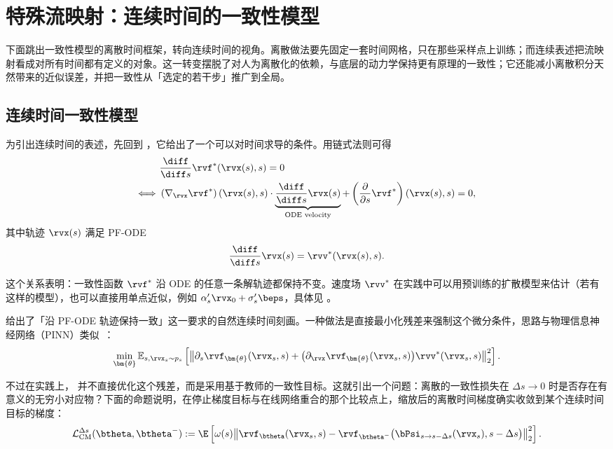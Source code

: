 \section{特殊流映射：连续时间的一致性模型}\label{sec:conti-cm}

下面跳出一致性模型的离散时间框架，转向连续时间的视角。离散做法要先固定一套时间网格，只在那些采样点上训练；而连续表述把流映射看成对所有时间都有定义的对象。这一转变摆脱了对人为离散化的依赖，与底层的动力学保持更有原理的一致性；它还能减小离散积分天然带来的近似误差，并把一致性从「选定的若干步」推广到全局。

\subsection{连续时间一致性模型}\label{subsec:conti-ct}
为引出连续时间的表述，先回到
，它给出了一个可以对时间求导的条件。用链式法则可得
\begin{align}\label{eq:conti-ct-motivation}
\begin{aligned}
        &\frac{\diff }{\diff s} \rvf^*(\rvx(s), s) = 0 \\
    \Longleftrightarrow\,\,
    &\left(\nabla_{\rvx} \rvf^*\right)(\rvx(s), s) \cdot
    \underbrace{\frac{\diff }{\diff s} \rvx(s)}_{\text{ODE velocity}} +
    \left(\frac{\partial }{\partial s} \rvf^*\right)(\rvx(s), s) = 0,
\end{aligned}
\end{align}
其中轨迹 $\rvx(s)$ 满足 PF-ODE
\begin{align*}
    \frac{\diff }{\diff s}\rvx(s) =  \rvv^*(\rvx(s), s).
\end{align*}

这个关系表明：一致性函数 $\rvf^*$ 沿 ODE 的任意一条解轨迹都保持不变。速度场 $\rvv^*$ 在实践中可以用预训练的扩散模型来估计（若有这样的模型），也可以直接用单点近似，例如
$\alpha_s' \rvx_0 + \sigma_s' \beps$，具体见
。

 给出了「沿 PF-ODE 轨迹保持一致」这一要求的自然连续时间刻画。一种做法是直接最小化残差来强制这个微分条件，思路与物理信息神经网络（PINN）类似~\citep{raissi2018deep,boffi2024flow}：
\begin{align*}
\min_{\bm{\theta}}
\mathbb{E}_{s,\rvx_s\sim p_s}
\left[
\left\|
\partial_s\rvf_{\bm{\theta}}(\rvx_s,s)
+
\big(\partial_{\rvx}\rvf_{\bm{\theta}}(\rvx_s,s)\big)
\rvv^*(\rvx_s,s)
\right\|_2^2
\right].
\end{align*}

不过在实践上，\citet{song2023consistency,lu2024simplifying} 并不直接优化这个残差，而是采用基于教师的一致性目标。这就引出一个问题：离散的一致性损失在 $\Delta s \to 0$ 时是否存在有意义的无穷小对应物？下面的命题说明，在停止梯度目标与在线网络重合的那个比较点上，缩放后的离散时间梯度确实收敛到某个连续时间目标的梯度：
\begin{align}\label{eq:cm-discrete}
\mathcal{L}_{\mathrm{CM}}^{\Delta s}(\btheta,\btheta^-)
:= \E \left[\omega(s) \big\|
\rvf_{\btheta}(\rvx_s,s) -
\rvf_{\btheta^-} \big(\bPsi_{s\to s-\Delta s}(\rvx_s), s-\Delta s\big)
\big\|_2^2\right].
\end{align}


